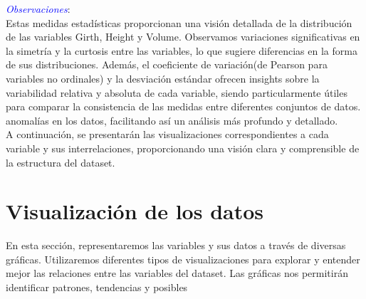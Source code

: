 \documentclass{article}
\begin{document}
\textcolor{blue}{\emph{Observaciones}}:\\
Estas medidas estadísticas proporcionan una visión detallada de la distribución de las variables Girth, Height y Volume. Observamos variaciones significativas en la simetría y la curtosis entre las variables, lo que sugiere diferencias en la forma de sus distribuciones. Además, el coeficiente de variación(de Pearson para variables no ordinales) y la desviación estándar ofrecen insights sobre la variabilidad relativa y absoluta de cada variable, siendo particularmente útiles para comparar la consistencia de las medidas entre diferentes conjuntos de datos.
anomalías en los datos, facilitando así un análisis más profundo y detallado.\\ 
A continuación, se presentarán las visualizaciones correspondientes a cada variable y sus interrelaciones, proporcionando una visión clara y comprensible de la estructura del dataset.
\section{Visualización de los datos}
En esta sección, representaremos las variables y sus datos a través de diversas gráficas. Utilizaremos diferentes tipos de visualizaciones para explorar y entender mejor las relaciones entre las variables del dataset. Las gráficas nos permitirán identificar patrones, tendencias y posibles
\end{document}
